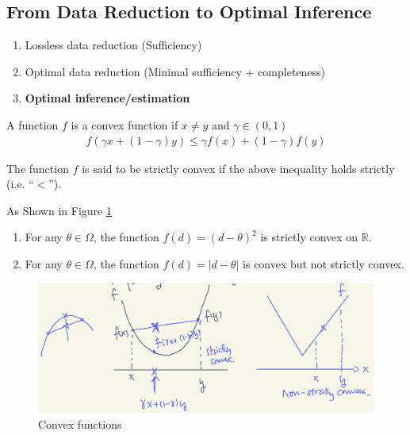 \subsection{From Data Reduction to Optimal Inference}
\begin{enumerate}
    \item Lossless data reduction (Sufficiency)
    \item Optimal data reduction (Minimal sufficiency + completeness)
    \item \textbf{Optimal inference/estimation}
\end{enumerate}

\begin{definition}
    A function $f$ is a convex function if $x\neq y$ and $\gamma\in(0,1)$
    \begin{gather}
        f(\gamma x+(1-\gamma) y) \leq \gamma f(x) + (1-\gamma) f(y)
    \end{gather}

    The function $f$ is said to be strictly convex if the above inequality holds strictly (i.e. ``$<$'').
\end{definition}


\begin{example}
    As Shown in Figure \ref{fig:convex}
    \begin{enumerate}
        \item For any $\theta\in\Omega$, the function $f(d)=(d-\theta)^2$ is strictly convex on $\mathbb{R}$.
        \item For any $\theta\in\Omega$, the function $f(d)=|d-\theta|$ is convex but not strictly convex.
    \end{enumerate}
\end{example}

\begin{figure}[htpb]
    \centering
    \includegraphics[width=\textwidth]{figures/convex.png}
    \caption{Convex functions}
    \label{fig:convex}
\end{figure}

